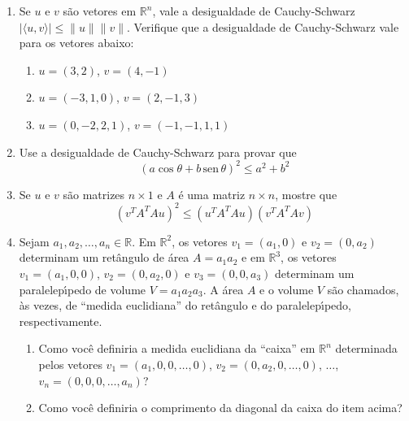\documentclass[a4paper,5pt]{amsbook}
\newcommand{\sen}{\,\mbox{sen}\,}
\begin{document}
\begin{enumerate}
	\vspace{0.5cm}
	\item Se $u$ e $v$ s\~ao vetores em $\mathbb{R}^n$, vale a desigualdade de
		Cauchy-Schwarz $|\langle u, v \rangle| \le \|u\| \|v\|$. Verifique que
		a desigualdade de Cauchy-Schwarz vale para os vetores abaixo:
		\begin{enumerate}
			\item $u = (3,2)$, $v = (4, -1)$
			\item $u = (-3,1,0)$, $v = (2,-1,3)$
			\item $u = (0,-2,2,1)$, $v = (-1,-1,1,1)$
		\end{enumerate}

	\vspace{0.5cm}
	\item Use a desigualdade de Cauchy-Schwarz para provar que
		\[{(a \cos\theta + b \sen\theta)}^2 \le a^2 + b^2\]

	\vspace{0.5cm}
	\item Se $u$ e $v$ s\~ao matrizes $n \times 1$ e $A$ \'e uma matriz $n \times
		n$, mostre que
		\[{\left(v^TA^TAu\right)}^2 \le \left(u^TA^TAu\right)\left(v^TA^TAv\right)\]

    \vspace{0.5cm}
    \item Sejam $a_1, a_2, \ldots, a_n\in\mathbb{R}$. Em $\mathbb{R}^2$, os vetores
        $v_1=(a_1,0)$ e $v_2=(0,a_2)$ determinam um ret\^angulo de \'area $A=a_1a_2$ e
        em $\mathbb{R}^3$, os vetores $v_1=(a_1,0,0)$, $v_2=(0,a_2,0)$ e
        $v_3=(0,0,a_3)$ determinam um paralelep\'{\i}pedo de volume $V=a_1a_2a_3$. A
        \'area $A$ e o volume $V$ s\~ao chamados, \`as vezes, de ``medida
        euclidiana'' do ret\^angulo e do paralelep\'{\i}pedo, respectivamente.
        \begin{enumerate}
            \item Como voc\^e definiria a medida euclidiana da ``caixa'' em
                $\mathbb{R}^n$ determinada pelos vetores
                $v_1=(a_1,0,0,\ldots,0)$, $v_2=(0,a_2,0,\ldots,0)$, $\ldots$,
                $v_n=(0,0,0,\ldots,a_n)$?
            \item Como voc\^e definiria o comprimento da diagonal da caixa do
                item acima?
        \end{enumerate}
\end{enumerate}
\end{document}
